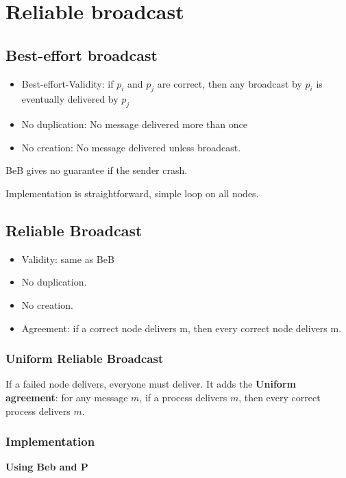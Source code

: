 \section{Reliable broadcast}

\subsection{Best-effort broadcast}

\begin{itemize}
	\item Best-effort-Validity: if $p_i$ and $p_j$ are correct,
	then any broadcast by $p_i$ is eventually delivered by $p_j$
	\item No duplication: No message delivered  more than once
	\item No creation: No message delivered unless broadcast.
\end{itemize}

BeB gives no guarantee if the sender crash.



Implementation is straightforward, simple loop on all nodes.

\subsection{Reliable Broadcast}
\begin{itemize}
	\item Validity: same as BeB
	\item No duplication.
	\item No creation.
	\item Agreement: if a correct node delivers m, then every correct
	node delivers m.
\end{itemize}
\subsubsection{Uniform Reliable Broadcast}
If a failed node delivers, everyone must deliver.
It adds the \textbf{Uniform agreement}: for any message $m$,
if a process delivers $m$, then every correct process delivers $m$.

\subsubsection{Implementation}
\textbf{Using Beb and P}

    

